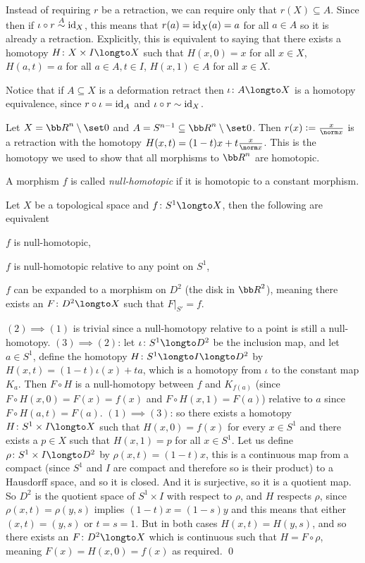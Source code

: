 \edefn

Instead of requiring $r$ be a retraction, we can require only that $r(X)\subseteq A$.
Since then if $\iota\circ r\buildrel A\over\sim{\rm id}_X$, this means that $r(a)={\rm id}_X(a)=a$ for all $a\in A$ so it is already a retraction.
Explicitly, this is equivalent to saying that there exists a homotopy $H\colon X\times I\longto X$ such that $H(x,0)=x$ for all $x\in X$, $H(a,t)=a$ for all $a\in A,t\in I$, $H(x,1)\in A$ for all $x\in X$.

Notice that if $A\subseteq X$ is a deformation retract then $\iota\colon A\longto X$ is a homotopy equivalence, since $r\circ\iota={\rm id}_A$ and $\iota\circ r\sim{\rm id}_X$.

\bexam

    Let $X={\bb R}^n\setminus\set0$ and $A=S^{n-1}\subseteq{\bb R}^n\setminus\set0$.
    Then $r(x)\coloneqq\frac x{\norm x}$ is a retraction with the homotopy $H(x,t)=(1-t)x+t\frac x{\norm x}$.
    This is the homotopy we used to show that all morphisms to ${\bb R}^n$ are homotopic.

\eexam

A morphism $f$ is called {\it null-homotopic} if it is homotopic to a constant morphism.

\bprop

    Let $X$ be a topological space and $f\colon S^1\longto X$, then the following are equivalent
    \benum
        \item $f$ is null-homotopic,
        \item $f$ is null-homotopic relative to any point on $S^1$,
        \item $f$ can be expanded to a morphism on $D^2$ (the disk in ${\bb R}^2$), meaning there exists an $F\colon D^2\longto X$ such that $F\bigr|_{S'}=f$.
    \eenum

\eprop

$(2)\implies(1)$ is trivial since a null-homotopy relative to a point is still a null-homotopy.
$(3)\implies(2)$: let $\iota\colon S^1\longto D^2$ be the inclusion map, and let $a\in S^1$, define the homotopy $H\colon S^1\longto I\longto D^2$ by $H(x,t)=(1-t)\iota(x)+ta$, which is a homotopy from
$\iota$ to the constant map $K_a$.
Then $F\circ H$ is a null-homotopy between $f$ and $K_{f(a)}$ (since $F\circ H(x,0)=F(x)=f(x)$ and $F\circ H(x,1)=F(a)$) relative to $a$ since $F\circ H(a,t)=F(a)$.
$(1)\implies(3)$: so there exists a homotopy $H\colon S^1\times I\longto X$ such that $H(x,0)=f(x)$ for every $x\in S^1$ and there exists a $p\in X$ such that $H(x,1)=p$ for all $x\in S^1$.
Let us define $\rho\colon S^1\times I\longto D^2$ by $\rho(x,t)=(1-t)x$, this is a continuous map from a compact (since $S^1$ and $I$ are compact and therefore so is their product) to a Hausdorff space, and
so it is closed.
And it is surjective, so it is a quotient map.
So $D^2$ is the quotient space of $S^1\times I$ with respect to $\rho$, and $H$ respects $\rho$, since $\rho(x,t)=\rho(y,s)$ implies $(1-t)x=(1-s)y$ and this means that either $(x,t)=(y,s)$ or $t=s=1$.
But in both cases $H(x,t)=H(y,s)$, and so there exists an $F\colon D^2\longto X$ which is continuous such that $H=F\circ\rho$, meaning $F(x)=H(x,0)=f(x)$ as required.
\qed

